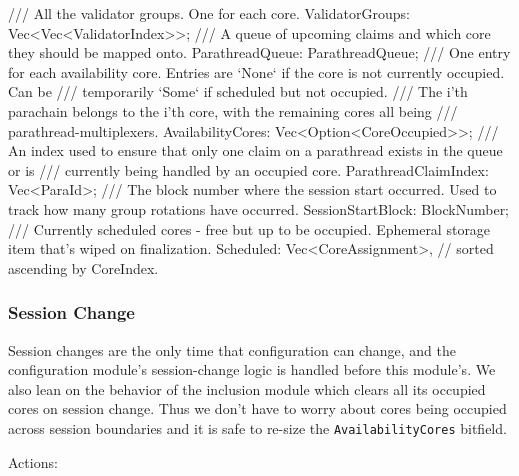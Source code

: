 \begin{verbnobox}[\small]
/// All the validator groups. One for each core.
ValidatorGroups: Vec<Vec<ValidatorIndex>>;
/// A queue of upcoming claims and which core they should be mapped onto.
ParathreadQueue: ParathreadQueue;
/// One entry for each availability core. Entries are `None` if the core is not currently occupied. Can be
/// temporarily `Some` if scheduled but not occupied.
/// The i'th parachain belongs to the i'th core, with the remaining cores all being
/// parathread-multiplexers.
AvailabilityCores: Vec<Option<CoreOccupied>>;
/// An index used to ensure that only one claim on a parathread exists in the queue or is
/// currently being handled by an occupied core.
ParathreadClaimIndex: Vec<ParaId>;
/// The block number where the session start occurred. Used to track how many group rotations have occurred.
SessionStartBlock: BlockNumber;
/// Currently scheduled cores - free but up to be occupied. Ephemeral storage item that's wiped on finalization.
Scheduled: Vec<CoreAssignment>, // sorted ascending by CoreIndex.
\end{verbnobox}

\subsubsection{Session Change}

Session changes are the only time that configuration can change, and the
configuration module's session-change logic is handled before this module's. We
also lean on the behavior of the inclusion module which clears all its occupied
cores on session change. Thus we don't have to worry about cores being occupied
across session boundaries and it is safe to re-size the \verb|AvailabilityCores|
bitfield.
\newline

Actions:

